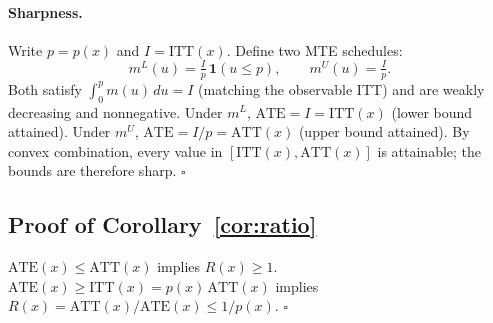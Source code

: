 \documentclass[12pt]{article}
\newcommand{\ATT}{\mathrm{ATT}}
\newcommand{\ATE}{\mathrm{ATE}}
\newcommand{\ITT}{\mathrm{ITT}}
\begin{document}
\paragraph{Sharpness.}
Write $p = p(x)$ and $I = \ITT(x)$. Define two MTE schedules:
\[
  m^L(u) = \tfrac{I}{p}\,\mathbf{1}(u \leq p),
  \qquad
  m^U(u) = \tfrac{I}{p}.
\]
Both satisfy $\int_0^p m(u)\,du = I$ (matching the observable ITT) and are
weakly decreasing and nonnegative. Under $m^L$, $\ATE = I = \ITT(x)$
(lower bound attained). Under $m^U$, $\ATE = I/p = \ATT(x)$ (upper bound
attained). By convex combination, every value in $[\ITT(x), \ATT(x)]$ is
attainable; the bounds are therefore sharp. \hfill$\square$

\subsection*{Proof of Corollary~\ref{cor:ratio}}

$\ATE(x) \leq \ATT(x)$ implies $R(x) \geq 1$.
$\ATE(x) \geq \ITT(x) = p(x)\,\ATT(x)$ implies
$R(x) = \ATT(x)/\ATE(x) \leq 1/p(x)$. \hfill$\square$



\end{document}
